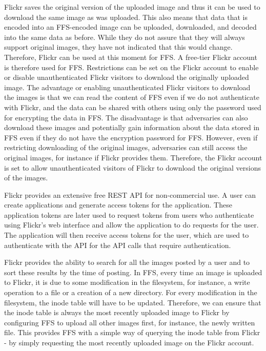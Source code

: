 Flickr saves the original version of the uploaded image and thus it can be used to download the same image as was uploaded. This also means that data that is encoded into an \gls{FFS}-encoded image can be uploaded, downloaded, and decoded into the same data as before. While they do not assure that they will always support original images, they have not indicated that this would change. Therefore, Flickr can be used at this moment for \gls{FFS}. A \mbox{free-tier} Flickr account is therefore used for \gls{FFS}. Restrictions can be set on the Flickr account to enable or disable unauthenticated Flickr visitors to download the originally uploaded image. The advantage or enabling unauthenticated Flickr visitors to download the images is that we can read the content of \gls{FFS} even if we do not authenticate with Flickr, and the data can be shared with others using only the password used for encrypting the data in \gls{FFS}. The disadvantage is that adversaries can also download these images and potentially gain information about the data stored in \gls{FFS} even if they do not have the encryption password for \gls{FFS}. However, even if restricting downloading of the original images, adversaries can still access the original images, for instance if Flickr provides them. Therefore, the Flickr account is set to allow unauthenticated visitors of Flickr to download the original versions of the images.

Flickr provides an extensive free REST \gls{API} for \mbox{non-commercial} use. A user can create applications and generate access tokens for the application. These application tokens are later used to request tokens from users who authenticate using Flickr's web interface and allow the application to do requests for the user. The application will then receive access tokens for the user, which are used to authenticate with the \gls{API} for the \gls{API} calls that require authentication.

Flickr provides the ability to search for all the images posted by a user and to sort these results by the time of posting. In \gls{FFS}, every time an image is uploaded to Flickr, it is due to some modification in the filesystem, for instance, a write operation to a file or a creation of a new directory. For every modification in the filesystem, the inode table will have to be updated. Therefore, we can ensure that the inode table is always the most recently uploaded image to Flickr by configuring \gls{FFS} to upload all other images first, for instance, the newly written file. This provides \gls{FFS} with a simple way of querying the inode table from Flickr - by simply requesting the most recently uploaded image on the Flickr account.

